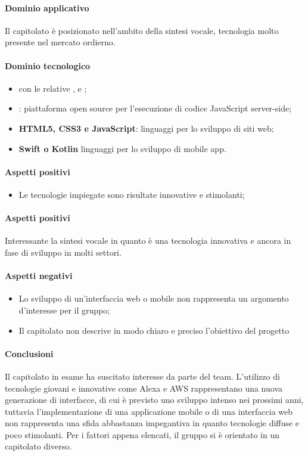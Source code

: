 	\paragraph{Dominio applicativo} 
     Il capitolato è posizionato nell'ambito della sintesi vocale, tecnologia molto presente nel mercato ordierno. 
	\paragraph{Dominio tecnologico}
	\begin{itemize}
		\item {\textbf{} con le relative ,  e };
		\item  \textbf{}: piattaforma open source per l'esecuzione di codice JavaScript server-side;
		\item \textbf{HTML5, CSS3 e JavaScript}: linguaggi per lo sviluppo di siti web;
		\item  \textbf{Swift o Kotlin} linguaggi per lo sviluppo di mobile app.
	\end{itemize}
	\paragraph{Aspetti positivi}
	\begin{itemize}
	\item {Le tecnologie impiegate sono risultate innovative e stimolanti;}
	\end{itemize}
	\paragraph{Aspetti positivi} 
	Interessante la sintesi vocale in quanto è una tecnologia innovativa e ancora in fase di sviluppo in molti settori.
	\paragraph{Aspetti negativi}
	\begin{itemize}
		\item Lo sviluppo di un'interfaccia web o mobile non rappresenta un argomento d'interesse per il gruppo;
		\item Il capitolato non descrive in modo chiaro e preciso l'obiettivo del progetto
	\end{itemize}
	\paragraph{Conclusioni} \Spazio
	Il capitolato in esame ha suscitato interesse da parte del team. L'utilizzo di tecnologie giovani e innovative come Alexa e AWS rappresentano una nuova generazione di interfacce, di cui è previsto uno sviluppo intenso nei prossimi anni, tuttavia l'implementazione di una applicazione mobile o di una interfaccia web non rappresenta una sfida abbastanza impegantiva in quanto tecnologie diffuse e poco stimolanti.
	Per i fattori appena elencati, il gruppo si è orientato in un capitolato diverso.
	
